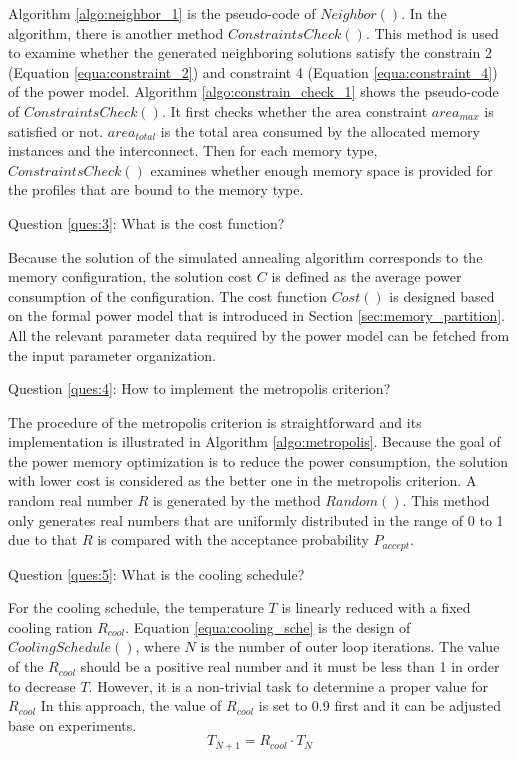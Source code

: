 		Algorithm \ref{algo:neighbor_1} is the pseudo-code of $Neighbor()$.
		In the algorithm, there is another method $ConstraintsCheck()$.
		This method is used to examine whether the generated neighboring solutions satisfy the
		constrain 2 (Equation \ref{equa:constraint_2}) and constraint 4
		(Equation \ref{equa:constraint_4}) of the power model.
		Algorithm \ref{algo:constrain_check_1} shows the pseudo-code of $ConstraintsCheck()$.
		It first checks whether the area constraint $area_{max}$ is satisfied
		or not.
		$area_{total}$ is the total area consumed by the allocated memory instances and the interconnect.
		Then for each memory type, $ConstraintsCheck()$ examines whether enough memory space is
		provided for the profiles that are bound to the memory type.
		
		

		Question \ref{ques:3}: What is the cost function?
		
		Because the solution of the simulated annealing algorithm corresponds to the
		memory configuration, the solution cost $C$ is defined as the average power
		consumption of the configuration. The cost function $Cost()$ is designed
		based on the formal power model that is introduced in Section
		\ref{sec:memory_partition}. All the relevant parameter data required by the
		power model can be fetched from the input parameter organization.
	
		Question \ref{ques:4}: How to implement the metropolis criterion?
	
		The procedure of the metropolis criterion is straightforward and its
		implementation is illustrated in Algorithm \ref{algo:metropolis}.
		Because the goal of the power memory optimization is to reduce the
		power consumption, the solution with lower cost is considered as the
		better one in the metropolis criterion.
		A random real number $R$ is generated by the method $Random()$.
		This method only generates real numbers that are uniformly distributed in the
		range of 0 to 1 due to that $R$ is compared with the acceptance probability
		$P_{accept}$.
	
		
	
		Question \ref{ques:5}: What is the cooling schedule?
		
		For the cooling schedule, the temperature $T$ is linearly reduced with a fixed
		cooling ration $R_{cool}$.
		Equation \ref{equa:cooling_sche} is the design of $CoolingSchedule()$, where
		$N$ is the number of outer loop iterations.
		The value of the $R_{cool}$ should be a positive real number and
		it must be less than 1 in order to decrease $T$.
		However, it is a non-trivial task to determine a proper value for $R_{cool}$
		In this approach, the value of $R_{cool}$ is set to 0.9 first and it can be
		adjusted base on experiments.
		\begin{equation}
		\label{equa:cooling_sche}
			T_{N+1}=R_{cool} \cdot T_{N}
		\end{equation}
		

